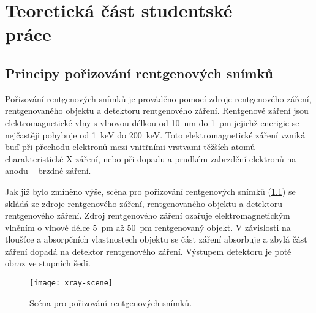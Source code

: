 \chapter[Teoretická část studentské práce]{Teoretická část studentské\\ práce}

\section{Principy pořizování rentgenových snímků}
Pořizování rentgenových snímků je prováděno pomocí zdroje rentgenového záření, rentgenovaného objektu a detektoru rentgenového záření. Rentgenové záření jsou elektromagnetické vlny s vlnovou délkou od \SI{10}{\nano\meter} do \SI{1}{\pico\meter} jejichž enerigie se nejčastěji pohybuje od \SI{1}{\kilo\eV} do \SI{200}{\kilo\eV}. Toto elektromagnetické záření vzniká buď při přechodu elektronů mezi vnitřními vrstvami těžších atomů -- charakteristické X-záření, nebo při dopadu a prudkém zabrzdění elektronů na anodu -- brzdné záření. \cite{AstroNuklFyzika-JadRadFyzika}

Jak již bylo zmíněno výše, scéna pro pořizování rentgenových snímků (\cref{fig:x-ray-scene}) se skládá ze zdroje rentgenového záření, rentgenovaného objektu a detektoru rentgenového záření. Zdroj rentgenového záření ozařuje elektromagnetickým vlněním o vlnové délce \SI{5}{\pico\meter} až \SI{50}{\pico\meter} rentgenovaný objekt. V závislosti na tloušťce a absorpčních vlastnostech objektu se část záření absorbuje a zbylá část záření dopadá na detektor rentgenového záření. Výstupem detektoru je poté obraz ve stupních šedi.

\begin{figure}[bh]
\texttt{[image: xray-scene]}
\caption{Scéna pro pořizování rentgenových snímků.}
\label{fig:x-ray-scene}
\centering
\end{figure}